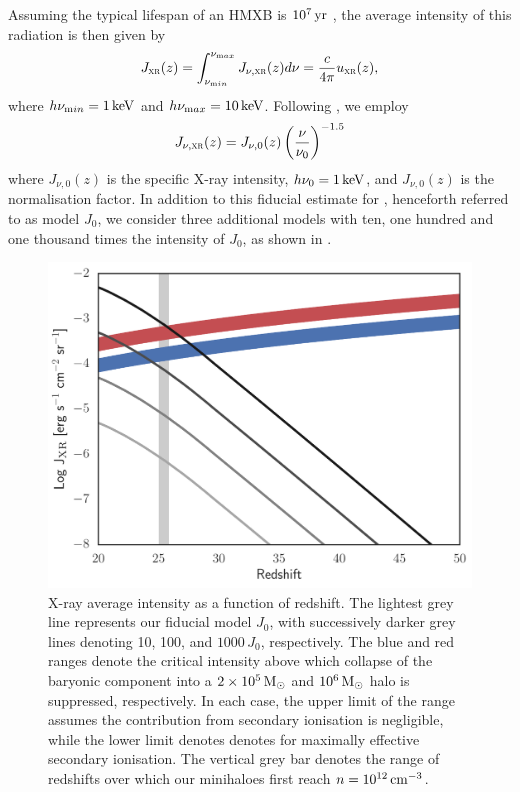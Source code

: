 \documentclass[../thesis.tex]{subfiles}
\begin{document}
Assuming the typical lifespan of an HMXB is $10^7\,\mathrm{yr}$ \citep[e.g.,][]{BelczynskiBulikFryer2012, Jeonetal2012}, the average
intensity of this radiation \jxrz is then given by 
\begin{equation} 
  J_{\textsc{xr}}(z) =  \int_{\nu_{\mathrm min}}^{\nu_{\mathrm max}} J_{\nu, \textsc{xr}}(z) d\nu = \frac{c}{4\pi} {u}_{\textsc{xr}}(z),
\end{equation}
where $h\nu_{\mathrm min} = 1\,\mathrm{keV}$ and $h\nu_{\mathrm max} = 10\,\mathrm{keV}$.
Following \citet{InayoshiOmukai2011}, we employ
\begin{equation}
  \label{JXRnu}
  J_{\nu, \textsc{xr}}(z) = J_{\nu,0}(z) \left(\frac{\nu}{\nu_0}\right)^{-1.5} 
\end{equation}
where $J_{\nu,0}(z)$ is the specific X-ray intensity, $h\nu_0 = 1\,\mathrm{keV}$, and $J_{\nu, 0}(z)$ is the normalisation factor.
In addition to this fiducial estimate for \jxrz, henceforth referred to as model $J_0$, we consider three
additional models with ten, one hundred and one thousand times the
intensity of $J_0$, as shown in . 

\begin{figure}
 \begin{center}
   \includegraphics[width=\columnwidth]{figures/J_xr}
   \caption{X-ray average intensity as a function of redshift. The
     lightest grey line represents our fiducial model $J_0$, with successively darker grey lines denoting 10, 100, and $1000\,J_0$, respectively. The blue and red ranges denote the critical intensity above which collapse of the baryonic component into a $2\times10^5\,\mathrm{M}_{\odot}$ and $10^6\,\mathrm{M}_{\odot}$ halo is suppressed, respectively. In each case, the upper limit of the range assumes the contribution from secondary ionisation is negligible, while the lower limit denotes denotes \jcrit for maximally effective secondary ionisation. The vertical grey bar denotes the range of redshifts over which our minihaloes first reach $n=10^{12}\,\mathrm{cm}^{-3}$.}
   \label{xrayIntensity}
 \end{center}
\end{figure}
\end{document}
